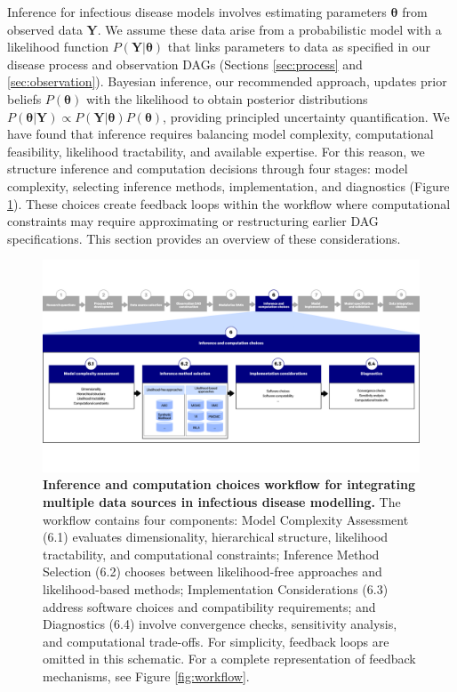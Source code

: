 \documentclass{article}
\begin{document}
Inference for infectious disease models involves estimating parameters $\boldsymbol{\theta}$ from observed data $\boldsymbol{Y}$.
We assume these data arise from a probabilistic model with a likelihood function $P(\boldsymbol{Y} |
  \boldsymbol{\theta})$ that links parameters to data as specified in our disease process and observation \ac{DAG}s (Sections \ref{sec:process} and \ref{sec:observation}).
Bayesian inference, our recommended approach, updates prior beliefs $P(\boldsymbol{\theta})$ with the likelihood to obtain posterior distributions $P(\boldsymbol{\theta} | \boldsymbol{Y}) \propto P(\boldsymbol{Y}|\boldsymbol{\theta}) P(\boldsymbol{\theta})$, providing principled uncertainty quantification.
We have found that inference requires balancing model complexity, computational feasibility, likelihood tractability, and available expertise.
For this reason, we structure inference and computation decisions through four stages: model complexity, selecting inference methods, implementation, and diagnostics (Figure \ref{fig:fitting}). 
These choices create feedback loops within the workflow where computational constraints may require approximating or restructuring earlier \ac{DAG} specifications.
This section provides an overview of these considerations.

\begin{figure}[htbp]
    \centering
    \includegraphics[width=\textwidth]{figures/Abbott et al figure 3.png}
    \caption{\textbf{Inference and computation choices workflow for integrating multiple data sources in infectious disease modelling.} The workflow contains four components: Model Complexity Assessment (6.1) evaluates dimensionality, hierarchical structure, likelihood tractability, and computational constraints; Inference Method Selection (6.2) chooses between likelihood-free approaches and likelihood-based methods; Implementation Considerations (6.3) address software choices and compatibility requirements; and Diagnostics (6.4) involve convergence checks, sensitivity analysis, and computational trade-offs. For simplicity, feedback loops are omitted in this schematic. For a complete representation of feedback mechanisms, see Figure \ref{fig:workflow}.}
    \label{fig:fitting}
\end{figure}
\end{document}
